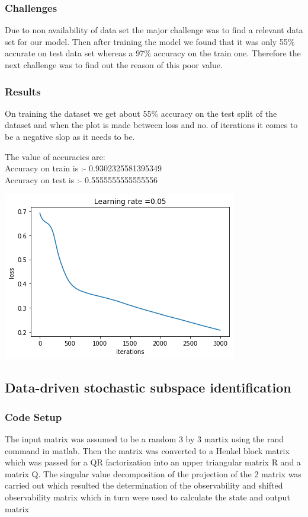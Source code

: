 \documentclass{article}
\begin{document}
\subsubsection{Challenges}
Due to non availability of data set the major challenge was to find a relevant data set for our model. Then after training the model we found that it was only 55\% accurate on test data set whereas a 97\% accuracy on the train one. Therefore the next challenge was to find out the reason of this poor value.

\subsubsection{Results}
On training the dataset we get about 55\% accuracy on the test split of the dataset and when the plot is made between loss and no. of iterations it comes to be a negative slop as it needs to be. 

The value of accuracies are:
\\Accuracy on train is :-  0.9302325581395349
\\Accuracy on test is :-  0.5555555555555556

\begin{center}
    \includegraphics[scale=0.7]{Images/Loss.png}
    
\end{center}

\subsection{Data-driven stochastic subspace identification}
\subsubsection{Code Setup}
The input matrix was assumed to be a random 3 by 3 martix using the rand command in matlab. Then the matrix was converted to a Henkel block matrix which was passed for a QR factorization into an upper triangular matrix R and a matrix Q. The singular value decomposition of the projection of the 2 matrix was carried out which resulted the determination of the observability and shifted observability matrix which in turn were used to calculate the state and output matrix
\end{document}
